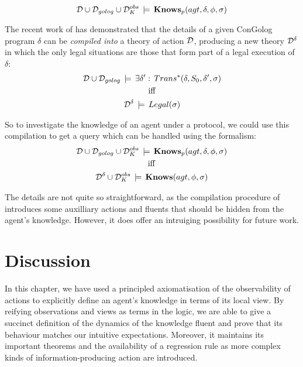 \[
\mathcal{D}\cup\mathcal{D}_{golog}\cup\mathcal{D}_{K}^{obs}\,\models\,\mathbf{Knows}_{p}(agt,\delta,\phi,\sigma)\]


The recent work of \citet{fritz08congolog_sin_trans} has demonstrated
that the details of a given ConGolog program $\delta$ can be \emph{compiled
into} a theory of action $\mathcal{D}$, producing a new theory $\mathcal{D}^{\delta}$
in which the only legal situations are those that form part of a legal
execution of $\delta$:\begin{gather*}
\mathcal{D}\cup\mathcal{D}_{golog}\,\models\,\exists\delta':\, Trans^{*}(\delta,S_{0},\delta',\sigma)\\
\mathrm{iff}\\
\mathcal{D}^{\delta}\,\models\, Legal(\sigma)\end{gather*}


So to investigate the knowledge of an agent under a protocol, we could
use this compilation to get a query which can be handled using the
formalism:\begin{gather*}
\mathcal{D}\cup\mathcal{D}_{golog}\cup\mathcal{D}_{K}^{obs}\,\models\,\mathbf{Knows}_{p}(agt,\delta,\phi,\sigma)\\
\mathrm{iff}\\
\mathcal{D}^{\delta}\cup\mathcal{D}_{K}^{obs}\,\models\,\mathbf{Knows}(agt,\phi,\sigma)\end{gather*}


The details are not quite so straightforward, as the compilation procedure
of \citep{fritz08congolog_sin_trans} introduces some auxilliary actions
and fluents that should be hidden from the agent's knowledge. However,
it does offer an intruiging possibility for future work.


\section{Discussion\label{sec:Knowledge:Discussion}}

In this chapter, we have used a principled axiomatisation of the observability
of actions to explicitly define an agent's knowledge in terms of its
local view. By reifying observations and views as terms in the logic,
we are able to give a succinct definition of the dynamics of the knowledge
fluent and prove that its behaviour matches our intuitive expectations.
Moreover, it maintains its important theorems and the availability
of a regression rule as more complex kinds of information-producing
action are introduced.

